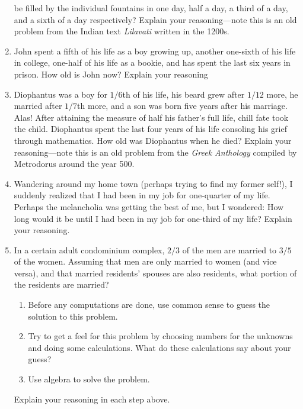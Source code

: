 \begin{problems}
\begin{enumerate}
  be filled by the individual fountains in one day, half a day, a
  third of a day, and a sixth of a day respectively? Explain your
  reasoning---note this is an old problem from the Indian text
  \textit{Lilavati} written in the 1200s.
\item John spent a fifth of his life as a boy growing up, another
  one-sixth of his life in college, one-half of his life as a bookie,
  and has spent the last six years in prison. How old is John now?
  Explain your reasoning
\item Diophantus was a boy for $1/6$th of his life, his beard grew
  after $1/12$ more, he married after $1/7$th more, and a son was born
  five years after his marriage. Alas! After attaining the measure of
  half his father's full life, chill fate took the child. Diophantus
  spent the last four years of his life consoling his grief through
  mathematics. How old was Diophantus when he died?  Explain your
  reasoning---note this is an old problem from the \textit{Greek
    Anthology} compiled by Metrodorus around the year 500.
\item Wandering around my home town (perhaps trying to find my former
  self!), I suddenly realized that I had been in my job for
  one-quarter of my life. Perhaps the melancholia was getting the best
  of me, but I wondered: How long would it be until I had been in my
  job for one-third of my life? Explain your reasoning.
\item In a certain adult condominium complex, $2/3$ of the men are
  married to $3/5$ of the women. Assuming that men are only married to
  women (and vice versa), and that married residents' spouses are also
  residents, what portion of the residents are married? 
\begin{enumerate}
\item Before any computations are done, use common sense to guess the
  solution to this problem.
\item Try to get a feel for this problem by choosing numbers for the
  unknowns and doing some calculations. What do these calculations say
  about your guess?
\item Use algebra to solve the problem.
\end{enumerate}
Explain your reasoning in each step above.


\end{enumerate}
\end{problems}
